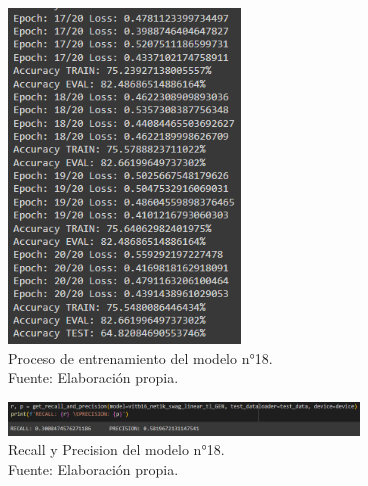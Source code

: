 \begin{figure}[H]
	\begin{center}
		\includegraphics[width=0.55\textwidth]{4/figures/model18_train.PNG}
		\caption[Proceso de entrenamiento del modelo n°18]{Proceso de entrenamiento del modelo n°18. \\
		Fuente: Elaboración propia.}
		\label{4:fig154}
	\end{center}
\end{figure}

\begin{figure}[H]
	\begin{center}
		\includegraphics[width=0.83\textwidth]{4/figures/model18_rp.PNG}
		\caption[Recall y Precision del modelo n°18]{Recall y Precision del modelo n°18. \\
		Fuente: Elaboración propia.}
		\label{4:fig155}
	\end{center}
\end{figure}


